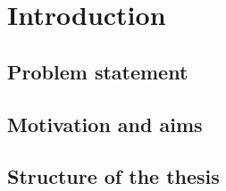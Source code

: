 \chapter{Introduction}\label{ch:introduction}
\section{Problem statement}\label{sec:problem-statement}
\section{Motivation and aims}\label{sec:motivation}
\section{Structure of the thesis}%
\label{sec:thesis-structure}
